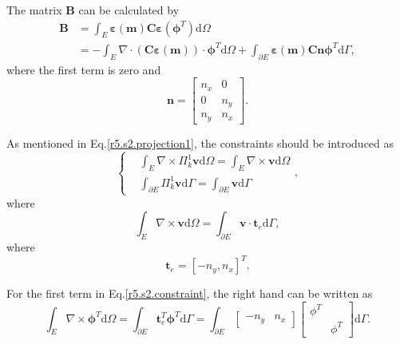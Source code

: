 \documentclass[kulak]{kulakarticle} %
\newcommand{\ud}{\mathrm{d}}
\begin{document}
The matrix $\bm{B}$ can be calculated by 
\begin{equation}
    \begin{aligned}
        \bm{B} &= \int_E\bm{\varepsilon}(\bm{m})\bm{C}\bm{\varepsilon}(\bm{\phi}^T)\ud\Omega\\
        &=-\int_E\nabla\cdot\left(\bm{C}\bm{\varepsilon}(\bm{m})\right)\cdot\bm{\phi}^T\ud\Omega+
        \int_{\partial E}\bm{\varepsilon}(\bm{m})\bm{C}\bm{n}\bm{\phi}^T\ud\Gamma,
    \end{aligned}
\end{equation}
where the first term is zero and  
\begin{equation}
    \bm{n} = \begin{bmatrix}
        n_x & 0\\ 0 & n_y\\ n_y & n_x
    \end{bmatrix}.
\end{equation}

As mentioned in Eq.\eqref{r5.s2.projection1}, the constraints should be introduced as 
\begin{equation}
    \label{r5.s2.constraint}
    \left\{
        \begin{aligned}
            &\int_{E}\nabla\times\Pi_k^1\bm{v}\ud\Omega = \int_E\nabla\times\bm{v}\ud\Omega\\
            &\int_{\partial E}\Pi_k^1\bm{v}\ud\Gamma = \int_{\partial E}\bm{v}\ud\Gamma
        \end{aligned}
    \right.,
\end{equation}
where 
\begin{equation}
    \int_E\nabla\times\bm{v}\ud\Omega = \int_{\partial E}\bm{v}\cdot\bm{t}_e\ud\Gamma,
\end{equation}
where 
\begin{equation}
    \bm{t}_e = [-n_y,n_x]^T.
\end{equation}

For the first term in Eq.\eqref{r5.s2.constraint}, the right hand can be written as 
\begin{equation}
    \int_{E}\nabla\times\bm{\phi}^T\ud\Omega = \int_{\partial E}\bm{t}_e^T\bm{\phi}^T\ud\Gamma =
    \int_{\partial E}
    \begin{bmatrix}
        -n_y & n_x
    \end{bmatrix}
    \begin{bmatrix}
        \phi^T & \\ & \phi^T
    \end{bmatrix}
    \ud\Gamma.
\end{equation}
\end{document}
